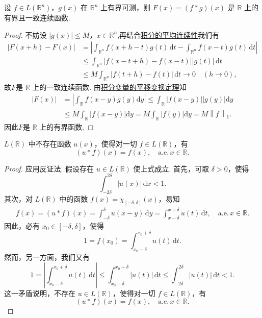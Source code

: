 \documentclass[../../main.tex]{subfiles}%
\begin{document}
\begin{proposition}[卷积是有界一致连续函数]\label{proposition:卷积是有界一致连续函数}
设 \( f \in L(\mathbb{R}^n) \)，\( g(x) \) 在 \( \mathbb{R}^n \) 上有界可测，则 \( F(x) = (f * g)(x) \) 是 \( \mathbb{R} \) 上的有界且一致连续函数.
\end{proposition}
\begin{proof}
不妨设 \( |g(x)| \leqslant  M \)，\( x \in \mathbb{R}^n \),再结合\hyperref[theorem:积分的平均连续性]{积分的平均连续性}我们有
\begin{align*}
|F(x + h) - F(x)| &= \left| \int_{\mathbb{R}^n} f(x + h - t) g(t) \, \mathrm{d}t - \int_{\mathbb{R}^n} f(x - t) g(t) \, \mathrm{d}t \right| \\
&\leqslant  \int_{\mathbb{R}^n} |f(x - t + h) - f(x - t)| |g(t)| \, \mathrm{d}t \\
&\leqslant  M \int_{\mathbb{R}^n} |f(t + h) - f(t)| \, \mathrm{d}t \to 0 \quad (h \to 0),
\end{align*}
故$F$是 \( \mathbb{R} \) 上的一致连续函数.
由\hyperref[theorem:积分变量的平移变换定理]{积分变量的平移变换定理}知
\begin{align*}
\left| F\left( x \right) \right|&=\left| \int_{\mathbb{R}}{f\left( x-y \right) g\left( y \right) \mathrm{d}y} \right|\leqslant \int_{\mathbb{R}}{\left| f\left( x-y \right) \right|\left| g\left( y \right) \right|\mathrm{d}y}
\\
&\leqslant M\int_{\mathbb{R}}{\left| f\left( x-y \right) \right|\mathrm{d}y}=M\int_{\mathbb{R}}{\left| f\left( y \right) \right|\mathrm{d}y}=M\left\| f \right\| _1.
\end{align*}
因此$F$是 \( \mathbb{R} \) 上的有界函数.
\end{proof}

\begin{proposition}[\( L \) 中无卷积单位]\label{proposition:L中无卷积单位}
\( L(\mathbb{R}) \) 中不存在函数 \( u(x) \)，使得对一切 \( f \in L(\mathbb{R}) \)，有
\[
(u * f)(x) = f(x), \quad \text{a.e.}\, x \in \mathbb{R}.
\]
\end{proposition}
\begin{proof}
应用反证法. 假设存在 \( u \in L(\mathbb{R}) \) 使上式成立. 首先，可取 \( \delta > 0 \)，使得
\[
\int_{-2\delta}^{2\delta} |u(x)| \, \mathrm{d}x < 1.
\]
其次，对 \( L(\mathbb{R}) \) 中的函数 \( f(x) = \chi_{[-\delta, \delta]}(x) \)，易知
\begin{align*}
f(x) = (u * f)(x) = \int_{-\delta}^{\delta} u(x - y) \, \mathrm{d}y = \int_{x - \delta}^{x + \delta} u(t) \, \mathrm{d}t, \quad \text{a.e.}\, x \in \mathbb{R}.
\end{align*}
因此，必有 \( x_0 \in [-\delta, \delta] \)，使得
\[
1 = f(x_0) = \int_{x_0 - \delta}^{x_0 + \delta} u(t) \, \mathrm{d}t.
\]
然而，另一方面，我们又有
\[
1 = \left| \int_{x_0 - \delta}^{x_0 + \delta} u(t) \, \mathrm{d}t \right| \leqslant  \int_{x_0 - \delta}^{x_0 + \delta} |u(t)| \, \mathrm{d}t \leqslant  \int_{-2\delta}^{2\delta} |u(t)| \, \mathrm{d}t < 1.
\]
这一矛盾说明，不存在 \( u \in L(\mathbb{R}) \)，使得对一切 \( f \in L(\mathbb{R}) \)，有
\[
(u * f)(x) = f(x), \quad \text{a.e.}\, x \in \mathbb{R}.
\]
\end{proof}
\end{document}
